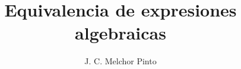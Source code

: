 \documentclass[12pt]{guia}
\title{Equivalencia de expresiones algebraicas}
\author{J. C. Melchor Pinto}
\begin{document}
\pagestyle{headandfoot}
\addpoints
\INFO
\begin{questions}
    \questionboxed[18]{}
    \questionboxed[16]{}
    \questionboxed[10]{}
    \questionboxed[16]{}
    \questionboxed[20]{}
    \questionboxed[20]{}
\end{questions}
\end{document}
